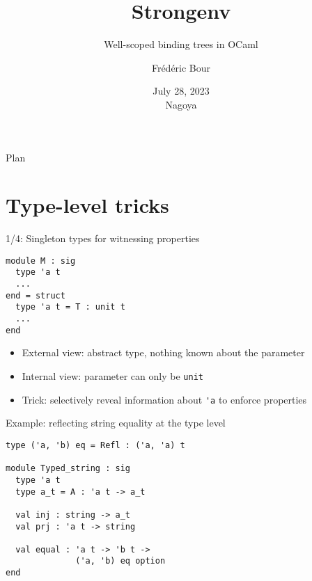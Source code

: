 \documentclass{beamer}          %
\title{Strongenv}  %
\subtitle{Well-scoped binding trees in OCaml}
\author{Frédéric Bour}                %
\institute{Tarides, Inria}          %
\date{July 28, 2023 \\ Nagoya}                  %
\begin{document}
\begin{frame}
  \titlepage
\end{frame}

\begin{frame}{Plan}
  \tableofcontents
\end{frame}


\section{Type-level tricks}


\begin{frame}[fragile]{1/4: Singleton types for witnessing properties}

\begin{lstlisting}
module M : sig
  type 'a t
  ...
end = struct
  type 'a t = T : unit t
  ...
end
\end{lstlisting}

  \begin{itemize}
    \item External view: abstract type, nothing known about the parameter
    \item Internal view: parameter can only be \lstinline{unit}
    \item Trick: selectively reveal information about \lstinline{'a} to enforce properties
  \end{itemize}

\end{frame}

\begin{frame}[fragile]{Example: reflecting string equality at the type level}
\begin{lstlisting}
type ('a, 'b) eq = Refl : ('a, 'a) t

module Typed_string : sig
  type 'a t
  type a_t = A : 'a t -> a_t

  val inj : string -> a_t
  val prj : 'a t -> string

  val equal : 'a t -> 'b t ->
              ('a, 'b) eq option
end
\end{lstlisting}
\end{frame}
\end{document}
